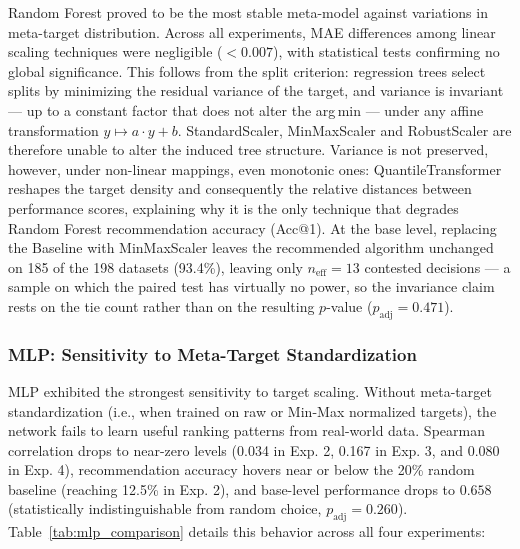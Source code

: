 \documentclass[12pt]{article}
\begin{document}
Random Forest proved to be the most stable meta-model against variations in meta-target distribution. Across all experiments, MAE differences among linear scaling techniques were negligible ($< 0.007$), with statistical tests confirming no global significance. This follows from the split criterion: regression trees select splits by minimizing the residual variance of the target, and variance is invariant --- up to a constant factor that does not alter the arg\,min --- under any affine transformation $y \mapsto a \cdot y + b$. StandardScaler, MinMaxScaler and RobustScaler are therefore unable to alter the induced tree structure. Variance is not preserved, however, under non-linear mappings, even monotonic ones: QuantileTransformer reshapes the target density and consequently the relative distances between performance scores, explaining why it is the only technique that degrades Random Forest recommendation accuracy (Acc@1). At the base level, replacing the Baseline with MinMaxScaler leaves the recommended algorithm unchanged on 185 of the 198 datasets (93.4\%), leaving only $n_{\text{eff}} = 13$ contested decisions --- a sample on which the paired test has virtually no power, so the invariance claim rests on the tie count rather than on the resulting $p$-value ($p_{\text{adj}} = 0.471$).

\subsubsection{MLP: Sensitivity to Meta-Target Standardization}
\label{subsec:analise_mlp}

MLP exhibited the strongest sensitivity to target scaling. Without meta-target standardization (i.e., when trained on raw or Min-Max normalized targets), the network fails to learn useful ranking patterns from real-world data. Spearman correlation drops to near-zero levels (0.034 in Exp. 2, 0.167 in Exp. 3, and 0.080 in Exp. 4), recommendation accuracy hovers near or below the 20\% random baseline (reaching 12.5\% in Exp. 2), and base-level performance drops to $0.658$ (statistically indistinguishable from random choice, $p_{\text{adj}} = 0.260$). Table~\ref{tab:mlp_comparison} details this behavior across all four experiments:
\end{document}
